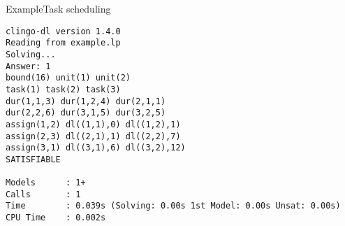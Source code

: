 \begin{frame}[fragile]{Example}{Task scheduling}
\begin{adjustbox}{max totalsize={\textwidth}{.83\textheight},keepaspectratio}
\begin{lstlisting}
clingo-dl version 1.4.0
Reading from example.lp
Solving...
Answer: 1
bound(16) unit(1) unit(2)
task(1) task(2) task(3)
dur(1,1,3) dur(1,2,4) dur(2,1,1)
dur(2,2,6) dur(3,1,5) dur(3,2,5)
assign(1,2) dl((1,1),0) dl((1,2),1)
assign(2,3) dl((2,1),1) dl((2,2),7)
assign(3,1) dl((3,1),6) dl((3,2),12)
SATISFIABLE

Models      : 1+
Calls       : 1
Time        : 0.039s (Solving: 0.00s 1st Model: 0.00s Unsat: 0.00s)
CPU Time    : 0.002s
\end{lstlisting}
\end{adjustbox}
\end{frame}

%
